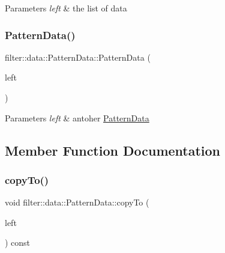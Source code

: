 \begin{DoxyParams}{Parameters}
{\em left} & the list of data \\
\hline
\end{DoxyParams}
\mbox{\label{classfilter_1_1data_1_1_pattern_data_a613199ad48d420607e97501258db7be1}} 
\subsubsection{\texorpdfstring{Pattern\+Data()}{PatternData()}\hspace{0.1cm}{\footnotesize\ttfamily [3/3]}}
{\footnotesize\ttfamily filter\+::data\+::\+Pattern\+Data\+::\+Pattern\+Data (\begin{DoxyParamCaption}\item[{const \hyperlink{classfilter_1_1data_1_1_pattern_data}{Pattern\+Data} \&}]{left }\end{DoxyParamCaption})\hspace{0.3cm}{\ttfamily [inline]}}


\begin{DoxyParams}{Parameters}
{\em left} & antoher \hyperlink{classfilter_1_1data_1_1_pattern_data}{Pattern\+Data} \\
\hline
\end{DoxyParams}


\subsection{Member Function Documentation}
\mbox{\label{classfilter_1_1data_1_1_pattern_data_ac31dcdd1b592d5f733f2d931c74f0cd8}} 
\subsubsection{\texorpdfstring{copy\+To()}{copyTo()}}
{\footnotesize\ttfamily void filter\+::data\+::\+Pattern\+Data\+::copy\+To (\begin{DoxyParamCaption}\item[{\hyperlink{classfilter_1_1data_1_1_pattern_data}{Pattern\+Data} \&}]{left }\end{DoxyParamCaption}) const\hspace{0.3cm}{\ttfamily [inline]}}


